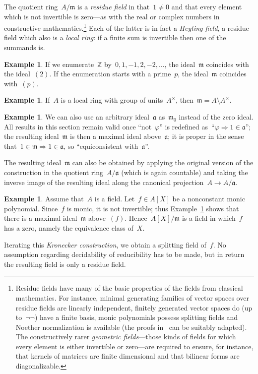 \documentclass[com,11pt,crcready]{iosart2x}
\theoremstyle{definition}
\newtheorem{example}[definition]{Example}
\theoremstyle{plain}
\theoremstyle{remark}
\newcommand{\aaa}{\mathfrak{a}}
\newcommand{\mmm}{\mathfrak{m}}
\newcommand{\ZZ}{\mathbb{Z}}
\renewcommand{\_}{\mathpunct{.}\,}
\begin{document}
The quotient ring~$A/\mmm$ is a \emph{residue field} in that~$1 \neq 0$
and that every element which is not invertible is zero---as with the real or
complex numbers in constructive mathematics.\footnote{Residue fields have
many of the basic properties of the fields from classical mathematics. For
instance, minimal generating families of vector spaces over residue fields are
linearly independent, finitely generated vector spaces do (up to~$\neg\neg$) have
a finite basis, monic polynomials possess splitting fields and Noether
normalization is available (the proofs
in~\cite{mines-richman-ruitenburg:constructive-algebra} can be suitably
adapted). The constructively rarer \emph{geometric fields}---those kinds of
fields for which every element is either invertible or zero---are required to
ensure, for instance, that kernels of matrices are finite dimensional and that bilinear forms
are diagonalizable.}
Each of the latter is in fact a \emph{Heyting field},
a residue field which also is a \emph{local ring}: if a finite
sum is invertible then one of the summands is.

\begin{example}If we enumerate~$\ZZ$ by~$0,1,-1,2,-2,\ldots$, the
ideal~$\mmm$ coincides with the ideal~$(2)$. If the enumeration starts with a
prime~$p$, the ideal~$\mmm$ coincides with~$(p)$.\end{example}

\begin{example}If~$A$ is a local ring with group of units~$A^\times$, then~$\mmm = A \setminus A^\times$.\end{example}

\begin{example}\label{ex:maximal-above}We can also use an
arbitrary ideal~$\aaa$ as~$\mmm_0$ instead of the zero ideal. All results in
this section remain valid once ``not~$\varphi$'' is redefined
as~``$\varphi \Rightarrow 1\in\aaa$''; the resulting ideal~$\mmm$ is then a
maximal ideal above~$\aaa$; it is proper in the sense that~$1 \in \mmm
\Rightarrow 1 \in \aaa$, so ``equiconsistent with~$\aaa$''.

The resulting ideal~$\mmm$ can also be obtained by applying the original
version of the construction in the quotient ring~$A/\aaa$ (which is again
countable) and taking the inverse image of the resulting ideal along the
canonical projection~$A \to A/\aaa$.\end{example}

\begin{example}Assume that~$A$ is a field. Let~$f \in A[X]$ be a nonconstant monic
polynomial. Since~$f$ is monic, it is not invertible; thus
Example~\ref{ex:maximal-above} shows that there is a maximal ideal~$\mmm$
above~$(f)$. Hence~$A[X]/\mmm$ is a field in which~$f$ has a zero, namely the equivalence class of~$X$.

Iterating this \emph{Kronecker construction}, we obtain a splitting field of~$f$. No
assumption regarding decidability of reducibility has to be made, but in return
the resulting field is only a residue field.\end{example}
\end{document}
